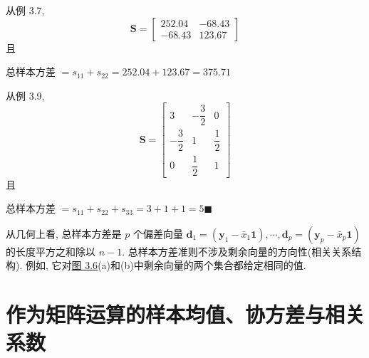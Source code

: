
从例 3.7,
\[
\mathbf{S}=\begin{bmatrix}252.04&-68.43\\-68.43&123.67\end{bmatrix}
\]
且

总样本方差 $=s_{11}+s_{22}=252.04+123.67=375.71$

从例 3.9,
\[
\mathbf{S}=\begin{bmatrix}3&-\dfrac{3}{2}&0\\[3pt]-\dfrac{3}{2}&1&\dfrac{1}{2}\\[3pt]0&\dfrac{1}{2}&1\end{bmatrix}
\]
且

总样本方差 $=s_{11}+s_{22}+s_{33}=3+1+1=5$\hfill$\blacksquare$

从几何上看, 总样本方差是 $p$ 个偏差向量 $\mathbf{d}_{1}=(\mathbf{y}_{1}-\bar{x}_{1}\mathbf{1}),\cdots,\mathbf{d}_{p}=(\mathbf{y}_{p}-\bar{x}_{p}\mathbf{1})$ 的长度平方之和除以 $n-1$. 总样本方差准则不涉及剩余向量的方向性(相关关系结构). 例如, 它对\hyperref[fig:3.6]{图 3.6}(a)和(b)中剩余向量的两个集合都给定相同的值.

\section{作为矩阵运算的样本均值、协方差与相关系数}  %
\label{sec:3.5}

